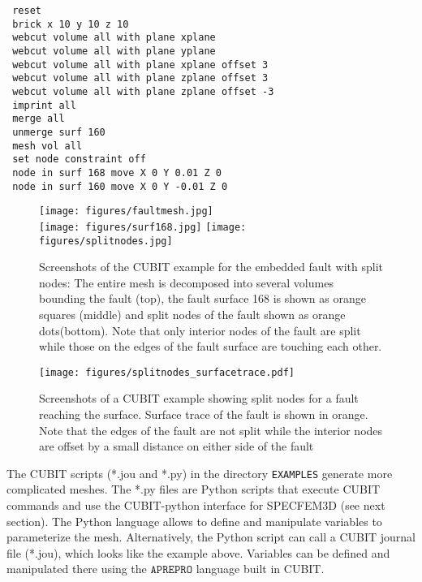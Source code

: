 {\footnotesize
\begin{verbatim}
 reset
 brick x 10 y 10 z 10
 webcut volume all with plane xplane
 webcut volume all with plane yplane
 webcut volume all with plane xplane offset 3
 webcut volume all with plane zplane offset 3
 webcut volume all with plane zplane offset -3
 imprint all
 merge all
 unmerge surf 160
 mesh vol all
 set node constraint off
 node in surf 168 move X 0 Y 0.01 Z 0
 node in surf 160 move X 0 Y -0.01 Z 0
\end{verbatim}
}

\begin{figure}[htbp]
\begin{centering}
\texttt{[image: figures/faultmesh.jpg]} \\
\texttt{[image: figures/surf168.jpg]}
\texttt{[image: figures/splitnodes.jpg]}
\par
\end{centering}
\caption{Screenshots of the CUBIT example for the embedded fault with split
nodes: The entire mesh is decomposed into several volumes bounding
the fault (top), the fault surface 168 is shown as orange squares
(middle) and split nodes of the fault shown as orange dots(bottom).
Note that only interior nodes of the fault are split while those on
the edges of the fault surface are touching each other.}
\label{fig:examples.splitnodes}
\end{figure}

\begin{figure}[htbp]
\begin{centering}
\texttt{[image: figures/splitnodes\_surfacetrace.pdf]}
\par
\end{centering}
\caption{Screenshots of a CUBIT example showing split nodes for a fault reaching
the surface. Surface trace of the fault is shown in orange. Note that
the edges of the fault are not split while the interior nodes are
offset by a small distance on either side of the fault}
\label{fig:examples.splitnodes-surfacetrace}
\end{figure}

\noindent
The CUBIT scripts ({*}.jou and {*}.py) in the directory \texttt{EXAMPLES}
generate more complicated meshes. The {*}.py files are Python scripts
that execute CUBIT commands and use the CUBIT-python interface for
SPECFEM3D (see next section). The Python language allows to define
and manipulate variables to parameterize the mesh. Alternatively,
the Python script can call a CUBIT journal file ({*}.jou), which looks
like the example above. Variables can be defined and manipulated there
using the $\mathtt{APREPRO}$ language built in CUBIT.\\

